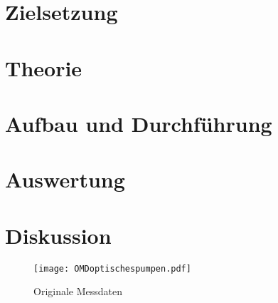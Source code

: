 

\setlength{\parindent}{0em}

\tableofcontents
%

\newpage

\section{Zielsetzung}



\section{Theorie}

\newpage

\section{Aufbau und Durchführung}

\newpage
\FloatBarrier

\section{Auswertung}

\newpage
\FloatBarrier

\section{Diskussion}



\nocite{*}
\printbibliography

\begin{figure}[h!]
  \centering
  \texttt{[image: OMDoptischespumpen.pdf]}
  \caption{Originale Messdaten}
  \label{OMD}
\end{figure}
\label{LastPage}
\FloatBarrier
\label{LastPage}


